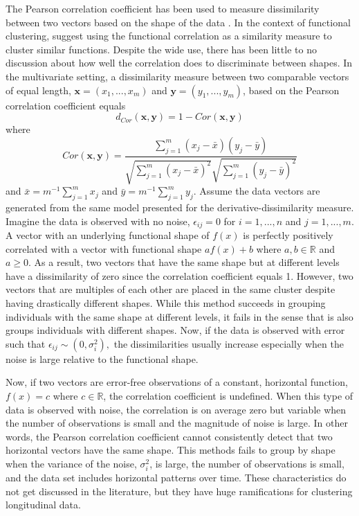 \documentclass[12pt]{article}
\newcommand{\B}[0]{\mathbf}
\begin{document}
The Pearson correlation coefficient has been used to measure dissimilarity between two vectors based on the shape of the data  \cite{chouakria2007,  eisen1998, chiou2008}. In the context of functional clustering, \textcite{chiou2008} suggest using the functional correlation as a similarity measure to cluster similar functions. Despite the wide use, there has been little to no discussion about how well the correlation does to discriminate between shapes. In the multivariate setting, a dissimilarity measure between two comparable vectors of equal length, $\B x=(x_{1},...,x_{m})$ and $\B y=(y_{1},...,y_{m})$, based on the Pearson correlation coefficient equals 
$$d_{Cor}(\B x,\B y) = 1-Cor(\B x,\B y)$$ 
where $$Cor(\B x,\B y) = \frac{\sum^{m}_{j=1}(x_{j}-\bar{x})(y_{j}-\bar{y})}{\sqrt{\sum^{m}_{j=1}(x_{j}-\bar{x})^{2}}\sqrt{\sum^{m}_{j=1}(y_{j}-\bar{y})^{2}}}$$
and $\bar{x} = m^{-1}\sum^{m}_{j=1} x_{j}$ and $\bar{y} = m^{-1}\sum^{m}_{j=1} y_{j}$. Assume the data vectors are generated from the same model presented for the derivative-dissimilarity measure. Imagine the data is observed with no noise, $\epsilon_{ij}=0$ for $i=1,...,n$ and $j=1,...,m$. A vector with an underlying functional shape of $f(x)$ is perfectly positively correlated with a vector with functional shape $af(x) + b$ where $a,b\in\mathbb{R}$ and $a\geq0$. As a result, two vectors that have the same shape but at different levels have a dissimilarity of zero since the correlation coefficient equals 1. However, two vectors that are multiples of each other are placed in the same cluster despite having drastically different shapes. While this method succeeds in grouping individuals with the same shape at different levels, it fails in the sense that is also groups individuals with different shapes. Now, if the data is observed with error such that $\epsilon_{ij}\sim(0,\sigma_{i}^{2}),$ the dissimilarities usually increase especially when the noise is large relative to the functional shape. 

Now, if two vectors are error-free observations of a constant, horizontal function, $f(x)=c$ where $c\in\mathbb{R}$, the correlation coefficient is undefined. When this type of data is observed with noise, the correlation is on average zero but variable when the number of observations is small and the magnitude of noise is large. In other words, the Pearson correlation coefficient cannot consistently detect that two horizontal vectors have the same shape. This methods fails to group by shape when the variance of the noise, $\sigma_{i}^{2}$, is large, the number of observations is small, and the data set includes horizontal patterns over time. These characteristics do not get discussed in the literature, but they have huge ramifications for clustering longitudinal data.
\end{document}

